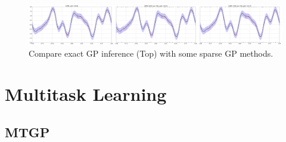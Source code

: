 \documentclass[11pt]{article}
\begin{document}
\begin{figure}[h!]
\begin{center} 
\includegraphics[width=\textwidth]{assets/plt_apx_comparison.png}
\caption{Compare exact GP inference (Top) with some sparse GP methods.}
\label{fig:plt_apx_comparison}
\end{center}
\end{figure}



\section{Multitask Learning}

\subsection{MTGP}
\end{document}

